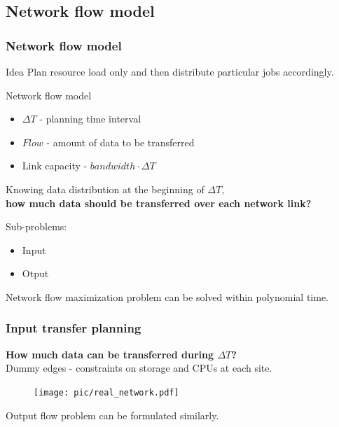 \documentclass{beamer}
\begin{document}
\subsection{Network flow model}
\begin{frame}\frametitle{Network flow model} 
  \begin{block}{Idea}
    Plan resource load only and then distribute particular jobs accordingly.
  \end{block}

  \begin{block}{Network flow model}
    \begin{itemize}
      \item $\Delta T$ - planning time interval
      \item $Flow$ - amount of data to be transferred
      \item Link capacity - $bandwidth \cdot \Delta T$
    \end{itemize}
  \end{block}    
  Knowing data distribution at the beginning of $\Delta T$,\\
  \textbf{how much data should be transferred over each network link?}
  
    \begin{block}{Sub-problems:}
    \begin{itemize}
      \item Input
      \item Otput
    \end{itemize}
  \end{block}  
  
  Network flow maximization problem can be solved within polynomial time.
\end{frame}

\begin{frame}\frametitle{Input transfer planning}
\textbf{How much data can be transferred during $\Delta T$?}\\
Dummy edges - constraints on  storage and CPUs at each site.
\vspace{-5mm}
\begin{figure}[h]
	\begin{center}
		\texttt{[image: pic/real\_network.pdf]}
	\end{center}
	\label{real_network}
\end{figure} 
\vspace{-3mm}
Output flow problem can be formulated similarly.
\end{frame}
\end{document}
